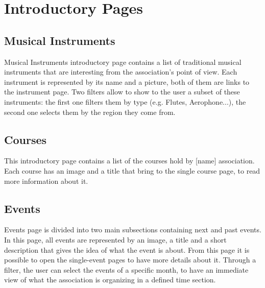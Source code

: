 \documentclass[../../DD.tex]{subfiles}
\begin{document}
\section{Introductory Pages \label{sect:2.1}}
	\subsection{Musical Instruments}
		Musical Instruments introductory page contains a list of traditional musical instruments that are interesting from the association's point of view. Each instrument is represented by its name and a picture, both of them are links to the instrument page. Two filters allow to show to the user a subset of these instruments: the first one filters them by type (e.g. Flutes, Aerophone...), the second one selects them by the region they come from.
	\subsection{Courses}
		This introductory page contains a list of the courses hold by [name] association. Each course has an image and a title that bring to the single course page, to read more information about it.
	\subsection{Events}
		Events page is divided into two main subsections containing next and past events. In this page, all events are represented by an image, a title and a short description that gives the idea of what the event is about. From this page it is possible to open the single-event pages to have more details about it. Through a filter, the user can select the events of a specific month, to have an immediate view of what the association is organizing in a defined time section.

	
\end{document}
